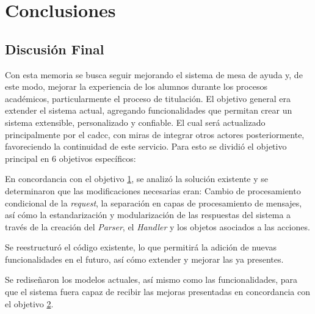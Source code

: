 \chapter{Conclusiones}
\section{Discusión Final}
    \par Con esta memoria se busca seguir mejorando el sistema de mesa de ayuda y, de este modo, mejorar la experiencia de los alumnos durante los procesos académicos, particularmente el proceso de titulación. El objetivo general era \guillemotleft extender el sistema actual, agregando funcionalidades que permitan crear un sistema extensible, personalizado y confiable. El cual será actualizado principalmente
    por el \acrshort{cadcc}, con miras de integrar otros actores posteriormente, favoreciendo la continuidad de este servicio\guillemotright. Para esto se dividió el objetivo principal en 6 objetivos específicos:

    \par En concordancia con el objetivo \href{sec:obj-e}{1}, se analizó la solución existente y se determinaron que las modificaciones necesarias eran: Cambio de procesamiento condicional de la \textit{request}, la separación en capas de procesamiento de mensajes, así cómo la estandarización y modularización de las respuestas del sistema a través de la creación del \textit{Parser}, el \textit{Handler} y los objetos asociados a las acciones.
    \par Se reestructuró el código existente, lo que permitirá la adición de nuevas funcionalidades en el futuro, así cómo extender y mejorar las ya presentes.

    \par Se rediseñaron los modelos actuales, así mismo como las funcionalidades, para que el sistema fuera capaz de recibir las mejoras presentadas en concordancia con el objetivo \href{sec:obj-e}{2}.

